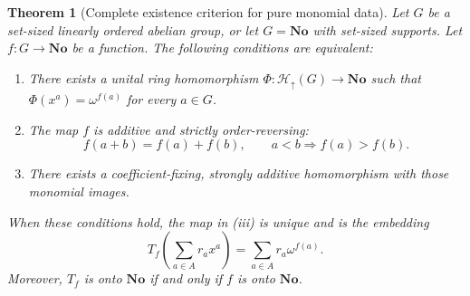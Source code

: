 \documentclass[11pt,letterpaper]{article}
\newtheorem{theorem}{Theorem}[section]
\theoremstyle{definition}
\theoremstyle{remark}
\newcommand{\No}{\mathbf{No}}
\newcommand{\Hu}[1]{\mathcal H_{\uparrow}(#1)}
\begin{document}
\begin{theorem}[Complete existence criterion for pure monomial data]\label{thm:classification}
Let $G$ be a set-sized linearly ordered abelian group, or let $G=\No$ with
set-sized supports. Let $f:G\to\No$ be a function. The following conditions
are equivalent:
\begin{enumerate}[label=(\roman*)]
\item There exists a unital ring homomorphism $\Phi:\Hu{G}\to\No$ such that
$\Phi(x^a)=\omega^{f(a)}$ for every $a\in G$.
\item The map $f$ is additive and strictly order-reversing:
\begin{equation}\label{eq:anti}
 f(a+b)=f(a)+f(b),\qquad a<b\Longrightarrow f(a)>f(b).
\end{equation}
\item There exists a coefficient-fixing, strongly additive homomorphism with
those monomial images.
\end{enumerate}
When these conditions hold, the map in (iii) is unique and is the embedding
\begin{equation}\label{eq:Tf}
 T_f\left(\sum_{a\in A}r_ax^a\right)
       =\sum_{a\in A}r_a\omega^{f(a)}.
\end{equation}
Moreover, $T_f$ is onto $\No$ if and only if $f$ is onto $\No$.
\end{theorem}
\end{document}
